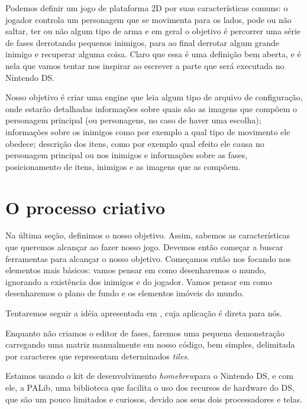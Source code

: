 \documentclass[brazil]{abnt}
\begin{document}
Podemos definir um jogo de plataforma 2D por suas características comuns: o jogador controla um personagem que se movimenta para os lados, pode ou não saltar, ter ou não algum tipo de arma e em geral o objetivo é percorrer uma série de fases derrotando pequenos inimigos, para ao final derrotar algum grande inimigo e recuperar alguma coisa. Claro que essa é uma definição bem aberta, e é nela que vamos tentar nos inspirar ao escrever a parte que será executada no Nintendo DS.

Nosso objetivo é criar uma engine que leia algum tipo de arquivo de configuração, onde estarão detalhadas informações sobre quais são as imagens que compõem o personagem principal (ou personagens, no caso de haver uma escolha); informações sobre os inimigos como por exemplo a qual tipo de movimento ele obedece; descrição dos itens, como por exemplo qual efeito ele causa no personagem principal ou nos inimigos e informações sobre as fases, posicionamento de itens, inimigos e as imagens que as compõem.

\section{O processo criativo}

Na última seção, definimos o nosso objetivo. Assim, sabemos as características que queremos alcançar ao fazer nosso jogo. Devemos então começar a buscar ferramentas para alcançar o nosso objetivo. Começamos então nos focando nos elementos mais básicos: vamos pensar em como desenharemos o mundo, ignorando a existência dos inimigos e do jogador. Vamos pensar em como desenharemos o plano de fundo e os elementos imóveis do mundo.

Tentaremos seguir a idéia apresentada em \cite{mameri06culling}, cuja aplicação é direta para nós.

Enquanto não criamos o editor de fases, faremos uma pequena demonstração carregando uma matriz manualmente em nosso código, bem simples, delimitada por caracteres que representam determinados \textit{tiles}.

Estamos usando o kit de desenvolvimento \textit{homebrew}\footnotemark para o Nintendo DS, e com ele, a PALib, uma biblioteca que facilita o uso dos recursos de hardware do DS, que são um pouco limitados e curiosos, devido aos seus dois processadores e telas.

\end{document}
